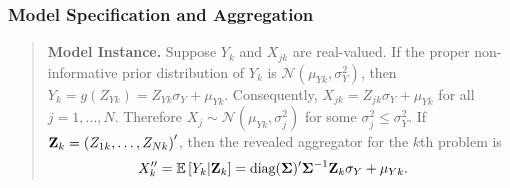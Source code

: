 \documentclass[11pt]{article}
\newcommand{\E}{\mathbb{E}}
\theoremstyle{definition}
\theoremstyle{definition}
\def\bSigma{{\bf \Sigma}}
\def\Z{{\bf Z}}
\def\E{{\mathbb E}}
\def\diag{\text{diag}}
\def\diag{\text{diag}}
\begin{document}
\subsubsection{Model Specification and Aggregation}
\begin{quote}
\textbf{Model Instance.} Suppose $Y_k$ and $X_{jk}$ are real-valued. If the proper non-informative prior distribution of $Y_k$ is $ \mathcal{N}(\mu_{Yk}, \sigma_Y^2)$, then $Y_k = g(Z_{Yk}) = Z_{Yk}\sigma_Y + \mu_{Yk}$. Consequently, $X_{jk} = Z_{jk}\sigma_Y + \mu_{Yk}$ for all $j = 1, \dots, N$. Therefore $X_j \sim \mathcal{N}(\mu_{Yk}, \sigma_j^2)$ for some $\sigma_j^2 \leq \sigma_Y^2$.  
%
  If $\Z_k = \left(Z_{1k}, \dots, Z_{Nk}\right)'$, then the revealed aggregator for the $k$th problem is 
\begin{align}
X_k'' =  \E\left[Y_k | \Z_k\right] &= \diag(\bSigma)' \bSigma^{-1} \Z_k \sigma_Y + \mu_{Yk}. \label{revPoint}
\end{align}
\end{quote}
\end{document}
